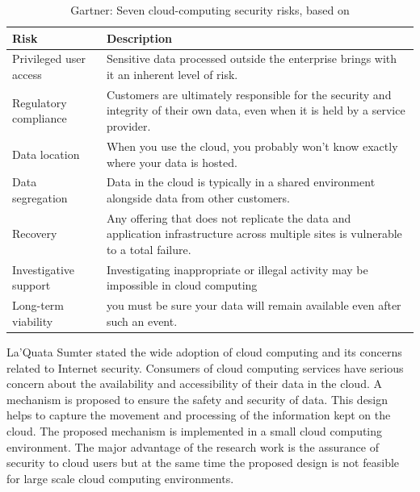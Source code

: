 \documentclass[a4paper,twoside,10pt]{report}
\begin{document}
\begin{table}[h]
	\centering
		\begin{tabular}{|p{4cm}|p{9cm}|}\hline
		
		\textbf{Risk} & \textbf{Description} \\ 
	\hline			
		Privileged user access & Sensitive data processed outside the enterprise brings with it an inherent level of risk. \\ \hline
		Regulatory compliance & Customers are ultimately responsible for the security and integrity of their own data, even when it is held by a service provider. \\ \hline
		Data location & When you use the cloud, you probably won't know exactly where your data is hosted. \\ \hline
		Data segregation & Data in the cloud is typically in a shared environment alongside data from other customers. \\ \hline
		 Recovery & Any offering that does not replicate the data and application infrastructure across multiple sites is vulnerable to a total failure. \\ \hline
		 Investigative support & Investigating inappropriate or illegal activity may be impossible in cloud computing \\ \hline
		 Long-term viability & you must be sure your data will remain available even after such an event. \\ \hline \hline
		
		\end{tabular}
	\caption{Gartner: Seven cloud-computing security risks, based on \cite{Gartner}}
	\label{tab:Gartner}
\end{table}

La'Quata Sumter \cite{Sumter:2010:CCS:1900008.1900152} stated the wide adoption of cloud computing and its concerns related to Internet security. Consumers of cloud computing services have serious concern about the availability and accessibility of their data in the cloud. A mechanism is proposed to ensure the safety and security of data. This design helps to capture the movement and processing of the information kept on the cloud. The proposed mechanism is implemented in a small cloud computing environment. The major advantage of the research work is the assurance of security to cloud users but at the same time the proposed design is not feasible for large scale cloud computing environments.
\end{document}
